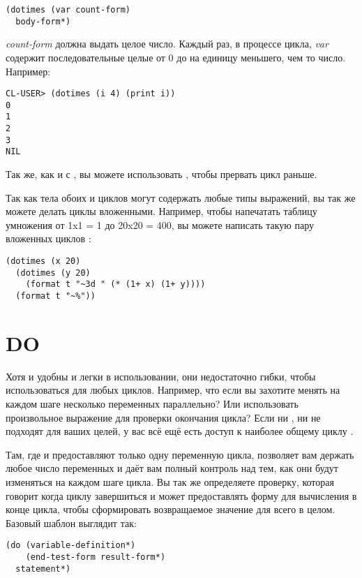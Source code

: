 \begin{lstlisting}
(dotimes (var count-form)
  body-form*)
\end{lstlisting}

\textit{count-form} должна выдать целое число. Каждый раз, в процессе цикла, \textit{var} содержит последовательные целые от 0 до на единицу меньшего, чем то число.  Например:

\begin{lstlisting}
CL-USER> (dotimes (i 4) (print i))
0
1
2
3
NIL
\end{lstlisting}

Так же, как и с , вы можете использовать , чтобы прервать цикл
раньше.

Так как тела обоих  и  циклов могут содержать любые типы
выражений, вы так же можете делать циклы вложенными. Например, чтобы напечатать таблицу
умножения от 1x1 = 1 до 20x20 = 400, вы можете написать такую пару вложенных циклов
:

\begin{lstlisting}
(dotimes (x 20)
  (dotimes (y 20)
    (format t "~3d " (* (1+ x) (1+ y))))
  (format t "~%"))
\end{lstlisting}

\section{DO}

Хотя  и  удобны и легки в использовании, они недостаточно
гибки, чтобы использоваться для любых циклов. Например, что если вы захотите менять на
каждом шаге несколько переменных параллельно? Или использовать произвольное выражение для
проверки окончания цикла? Если ни , ни  не подходят для ваших
целей, у вас всё ещё есть доступ к наиболее общему циклу .

Там, где  и  предоставляют только одну переменную цикла,
 позволяет вам держать любое число переменных и даёт вам полный контроль над тем,
как они будут изменяться на каждом шаге цикла. Вы так же определяете проверку, которая
говорит когда циклу завершиться и может предоставлять форму для вычисления в конце цикла,
чтобы сформировать возвращаемое значение для всего  в целом. Базовый шаблон
выглядит так:

\begin{lstlisting}
(do (variable-definition*)
    (end-test-form result-form*)
  statement*)
\end{lstlisting}

